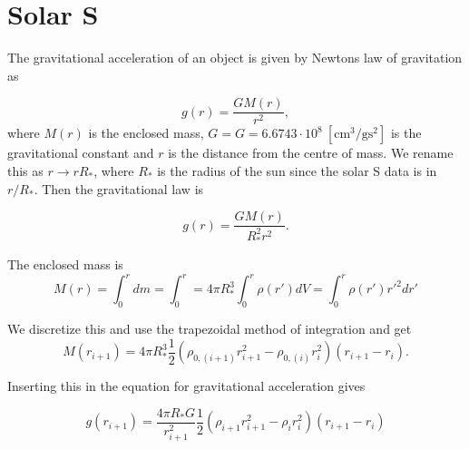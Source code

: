 \documentclass{article}
\begin{document}
\section{Solar S}

The gravitational acceleration of an object is given by Newtons law of gravitation as

\begin{equation}
    g(r)=\frac{GM(r)}{r^2},
\end{equation}
where $M(r)$ is the enclosed mass, $G=G = 6.6743\cdot10^8\ [\text{cm}^3/\text{gs}^2]$ is the gravitational constant and $r$ is the distance from the centre of mass. We rename this as $r\rightarrow r R_*$, where $R_*$ is the radius of the sun since the solar S data is in $r/R_*$. Then the gravitational law is

\begin{equation}
    g(r)=\frac{GM(r)}{R_*^2r^2}.
\end{equation}

The enclosed mass is
\begin{equation}
    M(r) = \int_0^r dm = \int_0^r =4\pi R_*^3 \int_0^r \rho(r')dV=\int_0^r \rho(r')r'^2 dr'
\end{equation}

We discretize this and use the trapezoidal method of integration and get
\begin{equation}
    M(r_{i+1}) = 4\pi R_*^3 \frac{1}{2}(\rho_{0,(i+1)}r_{i+1}^2-\rho_{0,(i)}r_{i}^2)(r_{i+1}-r_i).
\end{equation}

Inserting this in the equation for gravitational acceleration gives

\begin{equation}
    g(r_{i+1})=\frac{4\pi R_* G}{r_{i+1}^2}\frac{1}{2}(\rho_{i+1} r_{i+1}^2-\rho_i r_i^2)(r_{i+1}-r_{i})
\end{equation}
\end{document}
